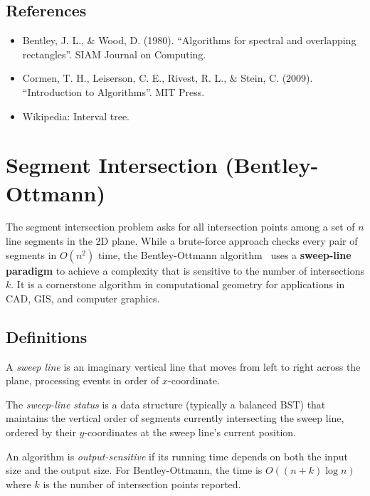 \subsection{References}

\begin{itemize}
\item Bentley, J. L., \& Wood, D. (1980). ``Algorithms for spectral and overlapping rectangles''. SIAM Journal on Computing.
\item Cormen, T. H., Leiserson, C. E., Rivest, R. L., \& Stein, C. (2009). ``Introduction to Algorithms''. MIT Press.
\item Wikipedia: Interval tree.
\end{itemize}


\section{Segment Intersection (Bentley-Ottmann)}
\label{sec:segment_intersection}

The segment intersection problem asks for all intersection points among a set of $n$ line segments in the 2D plane. While a brute-force approach checks every pair of segments in $O(n^2)$ time, the Bentley-Ottmann algorithm~\cite{bentley1979} uses a \textbf{sweep-line paradigm} to achieve a complexity that is sensitive to the number of intersections $k$. It is a cornerstone algorithm in computational geometry for applications in CAD, GIS, and computer graphics.

\subsection{Definitions}

\begin{definition}\label{def:sweep_line}
A \emph{sweep line} is an imaginary vertical line that moves from left to right across the plane, processing events in order of $x$-coordinate.
\end{definition}

\begin{definition}\label{def:status}
The \emph{sweep-line status} is a data structure (typically a balanced BST) that maintains the vertical order of segments currently intersecting the sweep line, ordered by their $y$-coordinates at the sweep line's current position.
\end{definition}

\begin{definition}\label{def:output_sensitive_seg}
An algorithm is \emph{output-sensitive} if its running time depends on both the input size and the output size. For Bentley-Ottmann, the time is $O((n + k) \log n)$ where $k$ is the number of intersection points reported.
\end{definition}

